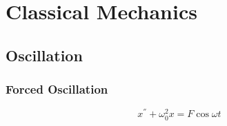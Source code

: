 \chapter{Classical Mechanics}


\section{Oscillation}
\subsection{Forced Oscillation}
\begin{equation}
    \label{eqn:forced oscillation}
    x^{''} + \omega_0^2x = F\cos\omega t
\end{equation}
